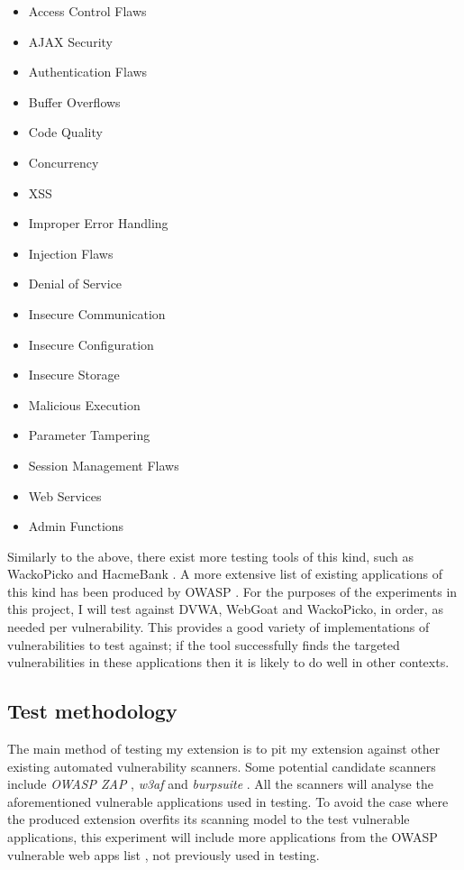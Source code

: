 \begin{multicols}{3}
	\begin{itemize}
		\item 	Access Control Flaws
		\item 	AJAX Security
		\item 	Authentication Flaws
		\item 	Buffer Overflows
		\item 	Code Quality
		\item 	Concurrency
		\item 	XSS
		\item 	Improper Error Handling
		\item 	Injection Flaws
		\item 	Denial of Service
		\item 	Insecure Communication
		\item 	Insecure Configuration
		\item 	Insecure Storage
		\item 	Malicious Execution
		\item 	Parameter Tampering
		\item 	Session Management Flaws
		\item 	Web Services
		\item 	Admin Functions
	\end{itemize}
\end{multicols}

Similarly to the above, there exist more testing tools of this kind, such as WackoPicko \cite{wackoPickoGithub} and HacmeBank \cite{hacmeBankMcAfee}. A more extensive list of existing applications of this kind has been produced by OWASP \cite{owaspVulnerableWebAppsList}. For the purposes of the experiments in this project, I will test against DVWA, WebGoat and WackoPicko, in order, as needed per vulnerability. This provides a good variety of implementations of vulnerabilities to test against; if the tool successfully finds the targeted vulnerabilities in these applications then it is likely to do well in other contexts.

\subsection{Test methodology}
The main method of testing my extension is to pit my extension against other existing automated vulnerability scanners. Some potential candidate scanners include \emph{OWASP ZAP} \cite{owaspZapPage}, \emph{w3af} \cite{w3af} and \emph{burpsuite} \cite{burpSuitePage}. All the scanners will analyse the aforementioned vulnerable applications used in testing. To avoid the case where the produced extension overfits its scanning model to the test vulnerable applications, this experiment will include more applications from the OWASP vulnerable web apps list \cite{owaspVulnerableWebAppsList}, not previously used in testing. \\

